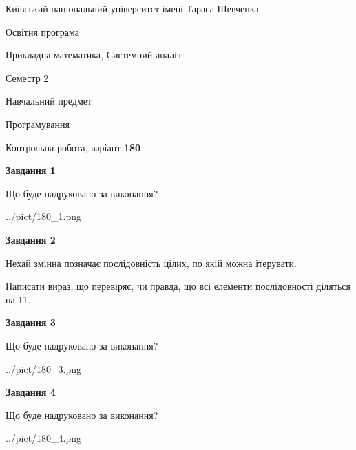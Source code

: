 \documentclass[12pt, ukrainian]{article}
\begin{document}
{{\begin {small}\par
{ \center  Київський національний університет імені Тараса Шевченка \par}
{\parbox {5 cm}{Освітня програма \hfill}{\parbox {8 cm}{Прикладна математика, Системний аналіз \hfill}}\parbox {5 cm}{\hfill Семестр 2}}\par
{\parbox {5 cm} {Навчальний предмет \hfill}\parbox {7 cm}{Програмування \hfill}\parbox {6cm}{\hfill}\par}\vspace{-7pt} \end{small}}{\center Контрольна робота, варіант  \No \textbf
{ 180 }\par}}
{
\begin {large}
{\begin {center}\textbf{Завдання 1}\end {center}}\par
Що буде надруковано за виконання?\par\par
\begin{center}
	{../pict/180_1.png}
\end{center}
\newpage

{\begin {center}\textbf{Завдання 2}\end {center}}\par
Нехай змінна  позначає послідовність цілих, по якій можна ітерувати.

Написати вираз, що перевіряє, чи правда, що всі елементи послідовності діляться на 11.\par
\newpage

{\begin {center}\textbf{Завдання 3}\end {center}}\par
Що буде надруковано за виконання?
\begin{center}
	{../pict/180_3.png}
\end{center}
\newpage

{\begin {center}\textbf{Завдання 4}\end {center}}\par
Що буде надруковано за виконання?\par
\begin{center}
	{../pict/180_4.png}
\end{center}
\newpage


\end{large}}
\end{document}
